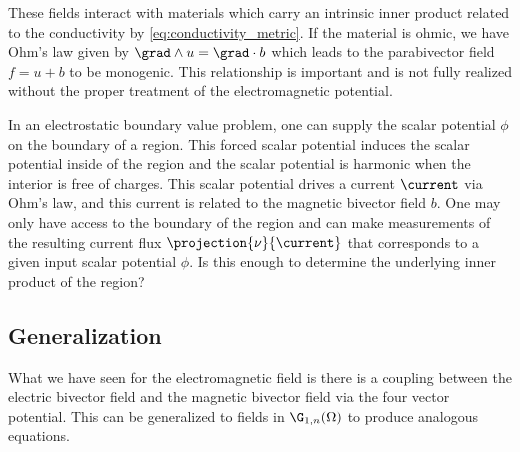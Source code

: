 These fields interact with materials which carry an intrinsic inner product related to the conductivity by \ref{eq:conductivity_metric}. If the material is ohmic, we have Ohm's law given by $\grad \wedge u = \grad \cdot b$ which leads to the parabivector field $f=u+b$ to be monogenic. This relationship is important and is not fully realized without the proper treatment of the electromagnetic potential. 

In an electrostatic boundary value problem, one can supply the scalar potential $\phi$ on the boundary of a region. This forced scalar potential induces the scalar potential inside of the region and the scalar potential is harmonic when the interior is free of charges.  This scalar potential drives a current $\current$ via Ohm's law, and this current is related to the magnetic bivector field $b$. One may only have access to the boundary of the region and can make measurements of the resulting current flux $\projection{\nu}{\current}$ that corresponds to a given input scalar potential $\phi$. Is this enough to determine the underlying inner product of the region?


\subsection{Generalization}
What we have seen for the electromagnetic field is there is a coupling between the electric bivector field and the magnetic bivector field via the four vector potential.  This can be generalized to fields in $\G_{1,n}(\Omega)$ to produce analogous equations.